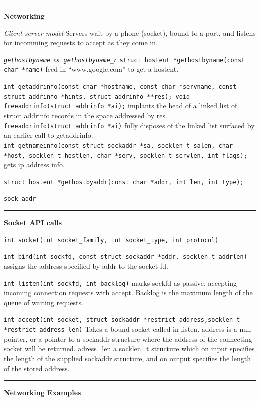 \documentclass{article}
\begin{document}
\begin{multicols}{2}
  \noindent\rule{4cm}{0.4pt}

  {\bf Networking}

  {\it Client-server model} Servers wait by a phone (socket), bound to a port,
  and listens for incomming requests to accept as they come in.

  {\it {\tt gethostbyname} vs. {\tt gethostbyname\_r}}
  {\tt struct hostent *gethostbyname(const char *name)} feed in
  ``www.google.com'' to get a hostent. %

  {\tt int getaddrinfo(const char *hostname, const char *servname,
  const struct addrinfo *hints, struct addrinfo **res);
  void freeaddrinfo(struct addrinfo *ai);} implants the head of a
  linked list of struct addrinfo records in the space addressed by
  res.\\
  {\tt freeaddrinfo(struct addrinfo *ai)} fully disposes of the linked list
  surfaced by an earlier call to getaddrinfo.\\
  {\tt int getnameinfo(const struct sockaddr *sa, socklen\_t salen,
  char *host, socklen\_t hostlen,
  char *serv, socklen\_t servlen, int flags);} gets ip address info.

  {\tt struct hostent *gethostbyaddr(const char *addr, int len, int type);}

  {\tt sock\_addr}

  \noindent\rule{4cm}{0.4pt}

  {\bf Socket API calls}

  {\tt int socket(int socket\_family, int socket\_type, int protocol)}

  {\tt int bind(int sockfd, const struct sockaddr *addr, socklen\_t addrlen)}
  assigns the address specified by addr to the socket fd.

  {\tt int listen(int sockfd, int backlog)} marks sockfd as passive, accepting
  incoming connection requests with accept. Backlog is the maximum length of the
  queue of waiting requests.

  {\tt int accept(int socket, struct sockaddr *restrict address,socklen\_t
  *restrict address\_len)} Takes a bound socket called in listen. address is a
  null pointer, or a pointer to a sockaddr structure where the address of the
  connecting socket will be returned. adress\_len a socklen\_t structure which on
  input specifies the length of the supplied sockaddr structure, and on output
  specifies the length of the stored address.

  \noindent\rule{4cm}{0.4pt}

  {\bf Networking Examples}


\end{multicols}
\end{document}
